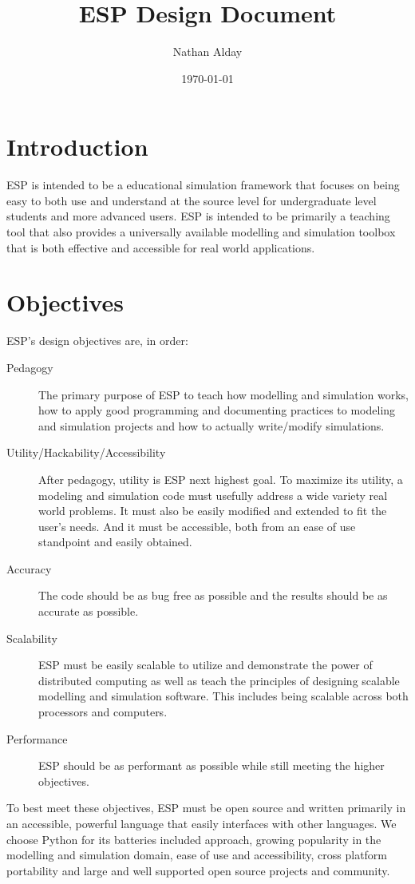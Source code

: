 \documentclass{article}
\begin{document}
\title{ESP Design Document}
\author{Nathan Alday}
\date{\today}
\maketitle

\section{Introduction}
ESP is intended to be a educational simulation framework that focuses on being easy to both use and understand at the source level for undergraduate level students and more advanced users. ESP is intended to be primarily a teaching tool that also provides a universally available modelling and simulation toolbox that is both effective and accessible for real world applications.

\section{Objectives}
ESP's design objectives are, in order:
\begin{description}
	\item[Pedagogy] The primary purpose of ESP to teach how modelling and simulation works, how to apply good programming and documenting practices to modeling and simulation projects and how to actually write/modify simulations.
	\item[Utility/Hackability/Accessibility] After pedagogy, utility is ESP next highest goal. To maximize its utility, a modeling and simulation code must usefully address a wide variety real world problems. It must also be easily modified and extended to fit the user's needs. And it must be accessible, both from an ease of use standpoint and easily obtained.
	\item[Accuracy] The code should be as bug free as possible and the results should be as accurate as possible.
	\item[Scalability] ESP must be easily scalable to utilize and demonstrate the power of distributed computing as well as teach the principles of designing scalable modelling and simulation software. This includes being scalable across both processors and computers.
	\item[Performance] ESP should be as performant as possible while still meeting the higher objectives.
\end{description}

To best meet these objectives, ESP must be open source and written primarily in an accessible, powerful language that easily interfaces with other languages. We choose Python for its batteries included approach, growing popularity in the modelling and simulation domain, ease of use and accessibility, cross platform portability and large and well supported open source projects and community.
\end{document}
